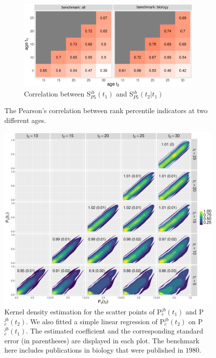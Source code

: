 \begin{figure}[ht!]
    \begin{subfigure}[b]{0.8\textwidth}
        \centering
             \includegraphics[width=\textwidth]{figures/pred_power/heatmap_cor_aut_future.eps}
         \caption{Correlation between S$_{P5}^{ib}(t_1)$ and S$_{P5}^{ib}(t_2 | t_1)$}
         \label{fig:hm_rp_aut_future}
    \end{subfigure}
    \caption[Correlations between rank percentiles at different ages]{The Pearson's correlation between rank percentile indicators at two different ages. }
    \label{fig:hm_rp}
\end{figure}

\begin{figure}[ht!]
    \centering
    \includegraphics[width=\textwidth]{figures/pred_power/scatter_pubrp_bio1980.eps}
    \caption[Kernel density estimation for the scatter points of P$_c(t_1)$ and P$_c(t_2)$]{Kernel density estimation for the scatter points of P$_c^{jb}(t_1)$ and P$_c^{jb}(t_2)$. We also fitted a simple linear regression of P$_c^{jb}(t_2)$ on P$_c^{jb}(t_1)$. The estimated coefficient and the corresponding standard error (in parentheses) are displayed in each plot. The benchmark here includes publications in biology that were published in $1980$.}
    \label{fig:scatter_pubrp_bio1980}
\end{figure}


